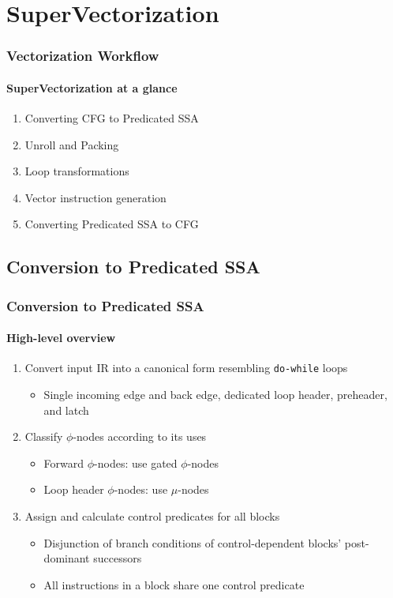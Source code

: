 \documentclass[aspectratio=169]{beamer}
\begin{document}
\section{SuperVectorization}
\begin{frame}
  \frametitle{Vectorization Workflow}
  \framesubtitle{SuperVectorization at a glance}

  \begin{enumerate}
    \item Converting CFG to Predicated SSA
    \item Unroll and Packing
    \item Loop transformations
    \item Vector instruction generation
    \item Converting Predicated SSA to CFG
  \end{enumerate}
\end{frame}

\subsection{Conversion to Predicated SSA}
\begin{frame}
  \frametitle{Conversion to Predicated SSA}
  \framesubtitle{High-level overview}

  \begin{enumerate}
    \item Convert input IR into a canonical form resembling \texttt{do-while} loops
    \begin{itemize}
      \item Single incoming edge and back edge, dedicated loop header, preheader, and latch
    \end{itemize}
    \pause
    \item Classify \(\phi\)-nodes according to its uses
    \begin{itemize}
      \item Forward \(\phi\)-nodes: use gated \(\phi\)-nodes
      \item Loop header \(\phi\)-nodes: use \(\mu\)-nodes
    \end{itemize}
    \pause
    \item Assign and calculate control predicates for all blocks
    \begin{itemize}
      \item Disjunction of branch conditions of control-dependent blocks' post-dominant successors
      \item All instructions in a block share one control predicate
    \end{itemize}
  \end{enumerate}
\end{frame}
\end{document}
